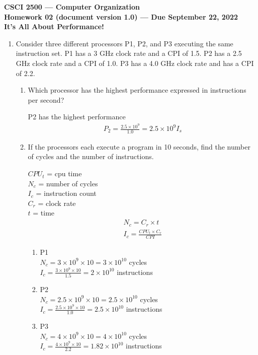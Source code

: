 \documentclass[10pt]{article}
\begin{document}
\begin{center}
    \textbf{CSCI 2500 — Computer Organization\\
    Homework 02 (document version 1.0) — Due September 22, 2022\\
    It’s All About Performance!\\}
\end{center}

\begin{enumerate}
    \item Consider three different processors P1, P2, and P3 executing the same instruction set. P1 has a 3 GHz clock rate and a CPI of 1.5. P2 has a 2.5 GHz clock rate and a CPI of 1.0. P3 has a 4.0 GHz clock rate and has a CPI of 2.2.
    
    \begin{enumerate}
        \item Which processor has the highest performance expressed in instructions per second?
        \begin{center}
            P2 has the highest performance
            \begin{align*}
                P_2 = \frac{2.5 \times 10^9}{1.0} = 2.5 \times 10^9I_s
            \end{align*}

        \end{center}
        
        \item If the processors each execute a program in 10 seconds, find the number of cycles and the number of instructions.
        \begin{center}
            $CPU_t$ = cpu time\\$N_c$ = number of cycles\\$I_c$ = instruction count\\$C_r$ = clock rate\\$t$ = time
            \begin{align*}
                N_c = C_r \times t\\
                I_c = \frac{CPU_t \times C_r}{CPI}
            \end{align*}
        \end{center}
        \begin{enumerate}
            \item P1 \\$N_c = 3 \times 10^9 \times 10 = 3\times10^{10}$ cycles\\$I_c = \frac{3\times10^9\times10}{1.5} = 2\times10^{10}$ instructions
            \item P2 \\$N_c = 2.5 \times 10^9 \times 10 = 2.5 \times 10^{10}$ cycles\\$I_c = \frac{2.5\times10^9\times10}{1.0} = 2.5\times10^{10}$ instructions
            \item P3 \\$N_c = 4 \times 10^9 \times 10 = 4\times10^{10}$ cycles \\ $I_c = \frac{4\times10^9\times10}{2.2} = 1.82\times10^{10}$ instructions
        \end{enumerate}
        


\end{enumerate}
\end{enumerate}
\end{document}
